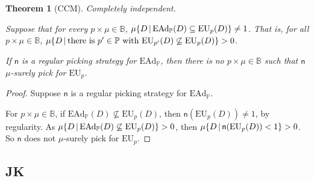 \documentclass[a4paper]{article}
\newtheorem{theorem}{Theorem}
\renewcommand\P{\mathbb{P}} %
\newcommand\EU{\mathrm{EU}}
\newcommand\EAd{\mathrm{EAd}}
\newcommand{\n}{\mathsf{n}}
\renewcommand{\nu}{\n}
\newcommand{\IB}{\mathbb{B}}
\newcommand{\IP}{\P}
\newcommand\SetDelimiter[1][]{
	\nonscript\,#1\vert \allowbreak \nonscript\,\mathopen{}}
\providecommand\given{\SetDelimiter}
\newenvironment{CCM rewritten}
{\begingroup\color{blue}} %
{\endgroup}              %
\begin{document}
\begin{theorem}[CCM]\label{thm:ead-existsimpermissible[indep]:reg}
	Completely independent. 
	
	Suppose that for every $p\times \mu\in \IB$, $\mu\{D\given \EAd_\IP(D)\subseteq \EU_p(D)\}\neq 1$. That is, for all $p\times \mu\in \IB$, $\mu\{D\given \text{there is $p'\in\IP$ with }\EU_{p'}(D)\not\subseteq\EU_p(D)\}>0$. 
	
	If $\nu$ is a regular picking strategy for $\EAd_\IP$, then there is no $p\times\mu\in \IB$ such that $\nu$ $\mu$-surely pick for $\EU_p$.
\end{theorem}
\begin{proof}
	Suppose $\nu$ is a regular picking strategy for $\EAd_\IP$. 
	
	For $p\times\mu\in\IB$, if $\EAd_\IP(D)\not\subseteq \EU_p(D)$, then $\nu(\EU_p(D))\neq 1$, by regularity. As 
	$\mu\{D\given \EAd_\IP(D)\not\subseteq \EU_p(D)\}>0$, then $\mu\{D\given \nu(\EU_p(D))<1\}>0$. So $\nu$ does not $\mu$-surely pick for $\EU_p$.  
\end{proof}
\subsection{JK}
\end{document}
